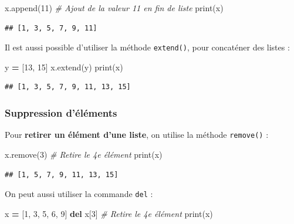 \documentclass[
  12pt,
]{book}
\newenvironment{Shaded}{\begin{snugshade}}{\end{snugshade}}
\newcommand{\BuiltInTok}[1]{#1}
\newcommand{\CommentTok}[1]{\textcolor[rgb]{0.56,0.35,0.01}{\textit{#1}}}
\newcommand{\DecValTok}[1]{\textcolor[rgb]{0.00,0.00,0.81}{#1}}
\newcommand{\KeywordTok}[1]{\textcolor[rgb]{0.13,0.29,0.53}{\textbf{#1}}}
\newcommand{\NormalTok}[1]{#1}
\newcommand{\OperatorTok}[1]{\textcolor[rgb]{0.81,0.36,0.00}{\textbf{#1}}}
\numberwithin{equation}{section}
\numberwithin{countremarque}{section}
\begin{document}
\begin{Shaded}
\begin{Highlighting}[]
\NormalTok{x.append(}\DecValTok{11}\NormalTok{) }\CommentTok{\# Ajout de la valeur 11 en fin de liste}
\BuiltInTok{print}\NormalTok{(x)}
\end{Highlighting}
\end{Shaded}

\begin{lstlisting}
## [1, 3, 5, 7, 9, 11]
\end{lstlisting}

Il est aussi possible d'utiliser la méthode \texttt{extend()}, pour concaténer des listes :

\begin{Shaded}
\begin{Highlighting}[]
\NormalTok{y }\OperatorTok{=}\NormalTok{ [}\DecValTok{13}\NormalTok{, }\DecValTok{15}\NormalTok{]}
\NormalTok{x.extend(y)}
\BuiltInTok{print}\NormalTok{(x)}
\end{Highlighting}
\end{Shaded}

\begin{lstlisting}
## [1, 3, 5, 7, 9, 11, 13, 15]
\end{lstlisting}

\subsubsection{Suppression d'éléments}\label{suppression-duxe9luxe9ments}

Pour \textbf{retirer un élément d'une liste}, on utilise la méthode \texttt{remove()} :

\begin{Shaded}
\begin{Highlighting}[]
\NormalTok{x.remove(}\DecValTok{3}\NormalTok{) }\CommentTok{\# Retire le 4e élément}
\BuiltInTok{print}\NormalTok{(x)}
\end{Highlighting}
\end{Shaded}

\begin{lstlisting}
## [1, 5, 7, 9, 11, 13, 15]
\end{lstlisting}

On peut aussi utiliser la commande \texttt{del} :

\begin{Shaded}
\begin{Highlighting}[]
\NormalTok{x }\OperatorTok{=}\NormalTok{ [}\DecValTok{1}\NormalTok{, }\DecValTok{3}\NormalTok{, }\DecValTok{5}\NormalTok{, }\DecValTok{6}\NormalTok{, }\DecValTok{9}\NormalTok{]}
\KeywordTok{del}\NormalTok{ x[}\DecValTok{3}\NormalTok{] }\CommentTok{\# Retire le 4e élément}
\BuiltInTok{print}\NormalTok{(x)}
\end{Highlighting}
\end{Shaded}
\end{document}
